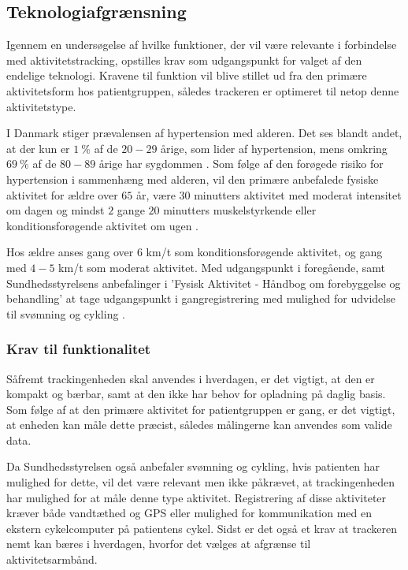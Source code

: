 \subsection{Teknologiafgrænsning}

Igennem en undersøgelse af hvilke funktioner, der vil være relevante i forbindelse med aktivitetstracking, opstilles krav som udgangspunkt for valget af den endelige teknologi. Kravene til funktion vil blive stillet ud fra den primære aktivitetsform hos patientgruppen, således trackeren er optimeret til netop denne aktivitetstype.

I Danmark stiger prævalensen af hypertension med alderen. Det ses blandt andet, at der kun er $1~\%$ af de $20-29$ årige, som lider af hypertension, mens omkring $69~\%$ af de $80-89$ årige har sygdommen \citep{olsen2015}. Som følge af den forøgede risiko for hypertension i sammenhæng med alderen, vil den primære anbefalede fysiske aktivitet for ældre over $65$ år, være $30$ minutters aktivitet med moderat intensitet om dagen og mindst $2$ gange $20$ minutters muskelstyrkende eller konditionsforøgende aktivitet om ugen \citep{pedersen2011}.

Hos ældre anses gang over $6$ km/t som konditionsforøgende aktivitet, og gang med $4-5$ km/t som moderat aktivitet. Med udgangspunkt i foregående, samt Sundhedsstyrelsens anbefalinger i 'Fysisk Aktivitet - Håndbog om forebyggelse og behandling' at tage udgangspunkt i gangregistrering med mulighed for udvidelse til svømning og cykling \citep{pedersen2011}.

\subsubsection{Krav til funktionalitet}

Såfremt trackingenheden skal anvendes i hverdagen, er det vigtigt, at den er kompakt og bærbar, samt at den ikke har behov for opladning på daglig basis. Som følge af at den primære aktivitet for patientgruppen er gang, er det vigtigt, at enheden kan måle dette præcist, således målingerne kan anvendes som valide data. 

Da Sundhedsstyrelsen også anbefaler svømning og cykling, hvis patienten har mulighed for dette, vil det være relevant men ikke påkrævet, at trackingenheden har mulighed for at måle denne type aktivitet. Registrering af disse aktiviteter kræver både vandtæthed og GPS eller mulighed for kommunikation med en ekstern cykelcomputer på patientens cykel. Sidst er det også et krav at trackeren nemt kan bæres i hverdagen, hvorfor det vælges at afgrænse til aktivitetsarmbånd.

